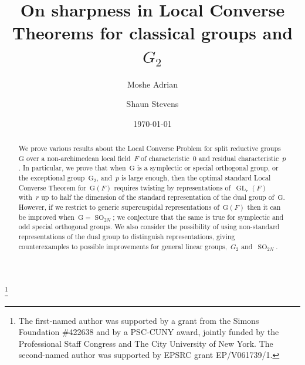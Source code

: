 \documentclass[12pt]{amsart}
\renewcommand\theequation{\thesection.\arabic{equation}}
\newcommand{\GL}{\operatorname{GL}}
\newcommand{\SO}{\operatorname{SO}}
\newcommand{\G}{\mathrm{G}}
\def\todo#1{\textcolor{red}{#1}}
\begin{document}
\renewcommand{\theequation}{\arabic{equation}}

\title[Local Converse Problem]{On sharpness in Local Converse Theorems for classical groups and $G_2$}

\author{Moshe Adrian}
\address{Department of Mathematics\\
Queens College, CUNY\\
Flushing, NY 11367}

\author{Shaun Stevens}
\address{%
University of East Anglia, UK}

\begin{abstract}
We prove various results about the Local Converse Problem for split reductive groups~$\G$ over a non-archimedean local field~$F$ of characteristic~$0$ and residual characteristic~$p$. In particular, we prove that when~$\G$ is a symplectic or special orthogonal group, or the exceptional group~$\G_2$, and~$p$ is large enough, then the optimal standard Local Converse Theorem for~$\G(F)$ requires twisting by representations of~$\GL_r(F)$ with~$r$ up to half the dimension of the standard representation of the dual group of~$\G$. However, if we restrict to generic supercuspidal representations of~$\G(F)$ then it can be improved when~$\G=\SO_{2N}$; we conjecture that the same is true for symplectic and odd special orthogonal groups. We also consider the possibility of using non-standard representations of the dual group to distinguish representations, giving counterexamples to possible improvements for general linear groups,~$G_2$ and~$\SO_{2N}$.
\end{abstract}

\date{\today}
\thanks{The first-named author was supported by a grant from the Simons Foundation \#422638 and by a PSC-CUNY award, jointly funded by the
Professional Staff Congress and The City University of New York. The second-named author was supported by EPSRC grant EP/V061739/1.}
\maketitle
\end{document}
